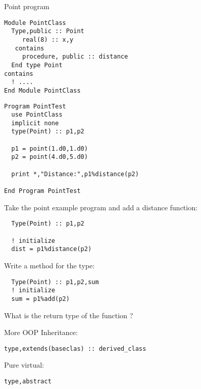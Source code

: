 \begin{block}{Point program}
  \label{sl:fpoint-program}
  \footnotesize
  
  \begin{multicols}{2}
\begin{verbatim}
Module PointClass
  Type,public :: Point
     real(8) :: x,y
   contains
     procedure, public :: distance
  End type Point
contains
  ! ....
End Module PointClass
\end{verbatim}
\columnbreak
\begin{verbatim}
Program PointTest
  use PointClass
  implicit none
  type(Point) :: p1,p2

  p1 = point(1.d0,1.d0)
  p2 = point(4.d0,5.d0)

  print *,"Distance:",p1%distance(p2)

End Program PointTest
\end{verbatim}
  \end{multicols}  
\end{block}

\begin{exercise}
  \label{ex:fclass-point-distance}
  Take the point example program and add a distance function:
\begin{verbatim}
  Type(Point) :: p1,p2
  
  ! initialize
  dist = p1%distance(p2)
\end{verbatim}
\end{exercise}

\begin{exercise}
  \label{ex:fclass-translate}
  Write a method  for the  type:
\begin{verbatim}
  Type(Point) :: p1,p2,sum
  ! initialize
  sum = p1%add(p2)
\end{verbatim}
  What is the return type of the function ?
\end{exercise}

\begin{block}{More OOP}
  \label{sl:oopf}
Inheritance:
\begin{verbatim}
type,extends(baseclas) :: derived_class
\end{verbatim}
Pure virtual:
\begin{verbatim}
type,abstract
\end{verbatim}
\end{block}

\endinput

\begin{block}{Use modules!}
  \label{sl:fclass-module}
   It is of course best to put the type definition and method
   definitions in a module, so that you can \n{use} it.

   Mark methods as \n{private} so that they can only be used as part
   of the \n{type}:

   \verbatimsnippet{classmodule}
\end{block}


